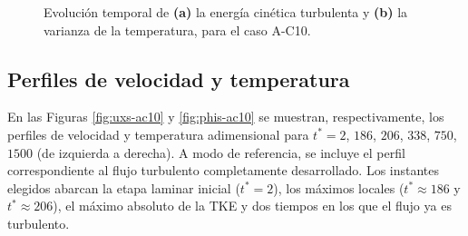 \newpage

\begin{figure}[H]
  \centering  
    
  \caption{Evolución temporal de \textbf{(a)} la energía cinética turbulenta y \textbf{(b)} la varianza de la temperatura, para el caso A-C10.}
  \label{fig:ac10-2}
\end{figure}

\subsection{Perfiles de velocidad y temperatura}

En las Figuras \ref{fig:uxs-ac10} y \ref{fig:phis-ac10} se muestran, respectivamente, los perfiles de velocidad y \linebreak temperatura adimensional para $t^*=2$, $186$, $206$, $338$, $750$, $1500$ (de izquierda a derecha). A modo de referencia, se incluye el perfil correspondiente al flujo turbulento completamente \linebreak desarrollado. Los instantes elegidos abarcan la etapa laminar inicial ($t^*=2$), los máximos locales ($t^* \approx 186$ y $t^* \approx 206$), el máximo absoluto de la TKE y dos tiempos en los que el flujo ya es turbulento.

